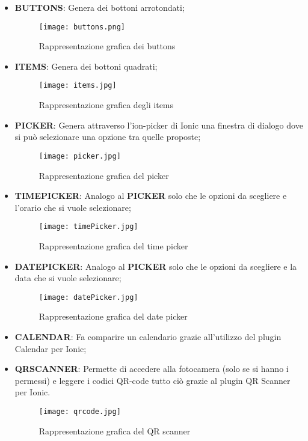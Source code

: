 \begin{itemize}
	\item \textbf{BUTTONS}: Genera dei bottoni arrotondati;
	\begin{figure}[h]
		\centering
		\texttt{[image: buttons.png]}
	\caption{Rappresentazione grafica dei buttons}
	\end{figure}
	\item \textbf{ITEMS}: Genera dei bottoni quadrati;
	\begin{figure}[h]
		\centering
		\texttt{[image: items.jpg]}
		\caption{Rappresentazione grafica degli items}
	\end{figure}
	\clearpage
	\item \textbf{PICKER}: Genera attraverso l'\textsf{ion-picker} di \textsf{Ionic} una finestra di dialogo dove si può selezionare una opzione tra quelle proposte;
	\begin{figure}[h]
		\centering
		\texttt{[image: picker.jpg]}
		\caption{Rappresentazione grafica del picker}
	\end{figure}
	\item \textbf{TIMEPICKER}: Analogo al \textbf{PICKER} solo che le opzioni da scegliere e l'orario che si vuole selezionare;
	\begin{figure}[h]
		\centering
		\texttt{[image: timePicker.jpg]}
		\caption{Rappresentazione grafica del time picker}
	\end{figure}
	\item \textbf{DATEPICKER}: Analogo al \textbf{PICKER} solo che le opzioni da scegliere e la data che si vuole selezionare;
	\begin{figure}[h]
		\centering
		\texttt{[image: datePicker.jpg]}
		\caption{Rappresentazione grafica del date picker}
	\end{figure}
	\item \textbf{CALENDAR}: Fa comparire un calendario grazie all'utilizzo del plugin \textsf{Calendar} per \textsf{Ionic};
	\clearpage
	\item \textbf{QRSCANNER}: Permette di accedere alla fotocamera (solo se si hanno i permessi) e leggere i codici \textsf{QR-code} tutto ciò grazie al plugin \textsf{QR Scanner} per \textsf{Ionic}.
	\begin{figure}[h]
		\centering
		\texttt{[image: qrcode.jpg]}
		\caption{Rappresentazione grafica del QR scanner}
	\end{figure}
\end{itemize}


